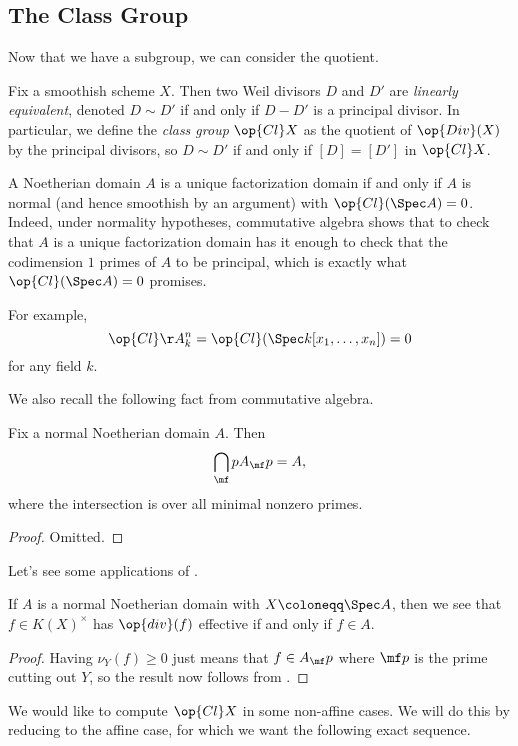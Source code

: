 \documentclass[../notes.tex]{subfiles}
\begin{document}
\subsection{The Class Group}
Now that we have a subgroup, we can consider the quotient.
\begin{defihelper} 
	Fix a smoothish scheme $X$. Then two Weil divisors $D$ and $D'$ are \textit{linearly equivalent}, denoted $D\sim D'$ if and only if $D-D'$ is a principal divisor. In particular, we define the \textit{class group} $\op{Cl}X$ as the quotient of $\op{Div}(X)$ by the principal divisors, so $D\sim D'$ if and only if $[D]=[D']$ in $\op{Cl}X$.
\end{defihelper}
\begin{example}
	A Noetherian domain $A$ is a unique factorization domain if and only if $A$ is normal (and hence smoothish by an argument) with $\op{Cl}(\Spec A)=0$. Indeed, under normality hypotheses, commutative algebra shows that to check that $A$ is a unique factorization domain has it enough to check that the codimension $1$ primes of $A$ to be principal, which is exactly what $\op{Cl}(\Spec A)=0$ promises.

	For example,
	\[\op{Cl}\AA^n_k=\op{Cl}(\Spec k[x_1,\ldots,x_n])=0\]
	for any field $k$.
\end{example}
We also recall the following fact from commutative algebra.
\begin{proposition} \label{prop:algebraic-hartogs}
	Fix a normal Noetherian domain $A$. Then
	\[\bigcap_\mf pA_\mf p=A,\]
	where the intersection is over all minimal nonzero primes.
\end{proposition}
\begin{proof}
	Omitted.
\end{proof}
Let's see some applications of .
\begin{corollary}
	If $A$ is a normal Noetherian domain with $X\coloneqq\Spec A$, then we see that $f\in K(X)^\times$ has $\op{div}(f)$ effective if and only if $f\in A$.
\end{corollary}
\begin{proof}
	Having $\nu_Y(f)\ge0$ just means that $f\in A_\mf p$ where $\mf p$ is the prime cutting out $Y$, so the result now follows from .
\end{proof}
We would like to compute $\op{Cl}X$ in some non-affine cases. We will do this by reducing to the affine case, for which we want the following exact sequence.
\end{document}

